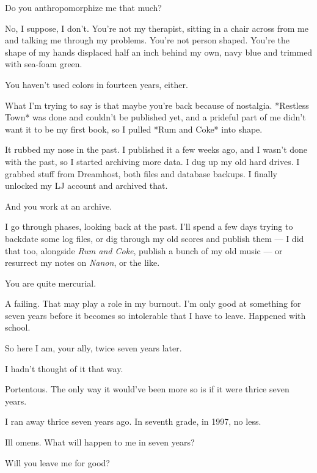 \begin{paracol}{2}
\begin{leftcolumn}
\begin{ally}
Do you anthropomorphize me that much?
\end{ally}
No, I suppose, I don't. You're not my therapist, sitting in a chair across from me and talking me through my problems. You're not person shaped. You're the shape of my hands displaced half an inch behind my own, navy blue and trimmed with sea-foam green.

\begin{ally}
You haven't used colors in fourteen years, either.
\end{ally}
What I'm trying to say is that maybe you're back because of nostalgia. *Restless Town* was done and couldn't be published yet, and a prideful part of me didn't want it to be my first book, so I pulled *Rum and Coke* into shape.

It rubbed my nose in the past. I published it a few weeks ago, and I wasn't done with the past, so I started archiving more data. I dug up my old hard drives. I grabbed stuff from Dreamhost, both files and database backups. I finally unlocked my LJ account and archived that.

\begin{ally}
And you work at an archive.
\end{ally}
I go through phases, looking back at the past. I'll spend a few days trying to backdate some log files, or dig through my old scores and publish them --- I did that too, alongside \emph{Rum and Coke}, publish a bunch of my old music --- or resurrect my notes on \emph{Nanon}, or the like.

\begin{ally}
You are quite mercurial.
\end{ally}
A failing. That may play a role in my burnout. I'm only good at something for seven years before it becomes so intolerable that I have to leave. Happened with school.

\begin{ally}
So here I am, your ally, twice seven years later.
\end{ally}
I hadn't thought of it that way.

\begin{ally}
Portentous. The only way it would've been more so is if it were thrice seven years.
\end{ally}
I ran away thrice seven years ago. In seventh grade, in 1997, no less.

\begin{ally}
Ill omens. What will happen to me in seven years?
\end{ally}
Will you leave me for good?


\end{leftcolumn}
\end{paracol}
